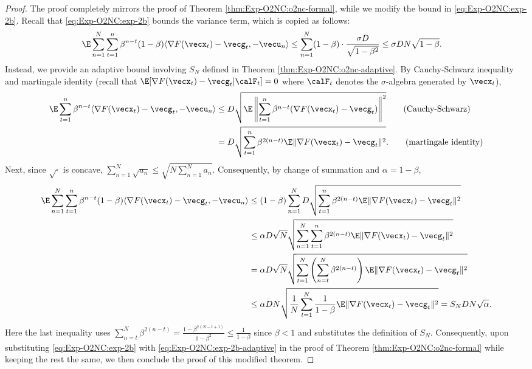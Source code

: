\begin{proof}
The proof completely mirrors the proof of Theorem \ref{thm:Exp-O2NC:o2nc-formal}, while we modify the bound in \eqref{eq:Exp-O2NC:exp-2b}. Recall that \eqref{eq:Exp-O2NC:exp-2b} bounds the variance term, which is copied as follows:
\begin{align*}
    \E\sum_{n=1}^N\sum_{t=1}^n \beta^{n-t}(1-\beta) \langle \nabla F(\vecx_t) - \vecg_t, -\vecu_n\rangle 
    &\le \sum_{n=1}^N (1-\beta) \cdot \frac{\sigma D}{\sqrt{1-\beta^2}}
    \le \sigma DN\sqrt{1-\beta}.
\end{align*}
Instead, we provide an adaptive bound involving $S_N$ defined in Theorem \ref{thm:Exp-O2NC:o2nc-adaptive}. By Cauchy-Schwarz inequality and martingale identity (recall that $\E[\nabla F(\vecx_t)-\vecg_t|\calF_t] = 0$ where $\calF_t$ denotes the $\sigma$-algebra generated by $\vecx_t$),
\begin{align*}
    \E\sum_{t=1}^n \beta^{n-t}\langle \nabla F(\vecx_t)-\vecg_t,-\vecu_n\rangle 
    &\le D \sqrt{\E \left\| \sum_{t=1}^n \beta^{n-t}(\nabla F(\vecx_t)-\vecg_t) \right\|^2} \tag{Cauchy-Schwarz}\\
    &= D\sqrt{\sum_{t=1}^n \beta^{2(n-t)} \E\|\nabla F(\vecx_t)-\vecg_t\|^2}. \tag{martingale identity}
\end{align*}
Next, since $\sqrt{\cdot}$ is concave, $\sum_{n=1}^N\sqrt{a_n} \le \sqrt{N\sum_{n=1}^N a_n}$. Consequently, by change of summation and $\alpha=1-\beta$,
\begin{align}
    \E\sum_{n=1}^N\sum_{t=1}^n \beta^{n-t}(1-\beta) \langle \nabla F(\vecx_t) - \vecg_t, -\vecu_n\rangle 
    &\le (1-\beta) \sum_{n=1}^N D\sqrt{\sum_{t=1}^n \beta^{2(n-t)} \E\|\nabla F(\vecx_t)-\vecg_t\|^2} \notag\\
    &\le \alpha D\sqrt{N} \sqrt{\sum_{n=1}^N\sum_{t=1}^n \beta^{2(n-t)} \E\|\nabla F(\vecx_t)-\vecg_t\|^2} \notag\\
    &= \alpha D\sqrt{N} \sqrt{\sum_{t=1}^N \left(\sum_{n=t}^N \beta^{2(n-t)}\right) \E\|\nabla F(\vecx_t)-\vecg_t\|^2} \notag\\
    &\le \alpha DN \sqrt{ \frac{1}{N}\sum_{t=1}^N \frac{1}{1-\beta}\E\|\nabla F(\vecx_t)-\vecg_t\|^2}
    = S_NDN\sqrt{\alpha}.
    \label{eq:Exp-O2NC:exp-2b-adaptive}
\end{align}
Here the last inequality uses $\sum_{n=t}^N \beta^{2(n-t)} = \frac{1-\beta^{2(N-t+1)}}{1-\beta^2} \le \frac{1}{1-\beta}$ since $\beta<1$ and substitutes the definition of $S_N$. Consequently, upon substituting \eqref{eq:Exp-O2NC:exp-2b} with \eqref{eq:Exp-O2NC:exp-2b-adaptive} in the proof of Theorem \ref{thm:Exp-O2NC:o2nc-formal} while keeping the rest the same, we then conclude the proof of this modified theorem.
\end{proof}


